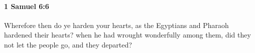 
		\paragraph{1 Samuel 6:6} %
			\label{1SAMUEL-6-6}

			Wherefore then do ye harden your hearts, as the Egyptians and Pharaoh hardened their hearts? when he had wrought wonderfully among them, did they not let the people go, and they departed?


